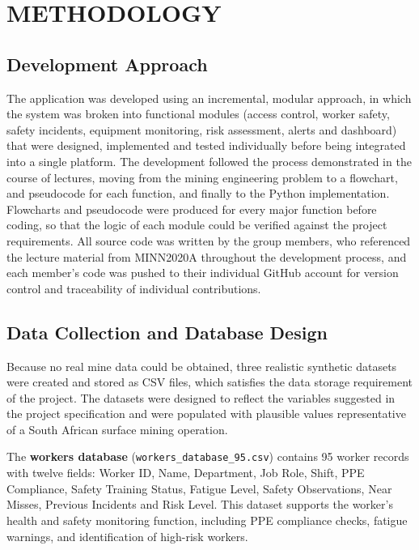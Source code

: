 \documentclass[
]{article}
\begin{document}
\section{ METHODOLOGY}

\subsection{Development Approach}

The application was developed using an incremental, modular approach, in which the system was broken into functional modules (access control, worker safety, safety incidents, equipment monitoring, risk assessment, alerts and dashboard) that were designed, implemented and tested individually before being integrated into a single platform. The development followed the process demonstrated in the course of lectures, moving from the mining engineering problem to a flowchart, and pseudocode for each function, and finally to the Python implementation. Flowcharts and pseudocode were produced for every major function before coding, so that the logic of each module could be verified against the project requirements. All source code was written by the group members, who referenced the lecture material from MINN2020A throughout the development process, and each member's code was pushed to their individual GitHub account for version control and traceability of individual contributions.

\subsection{Data Collection and Database Design}

Because no real mine data could be obtained, three realistic synthetic datasets were created and stored as CSV files, which satisfies the data storage requirement of the project. The datasets were designed to reflect the variables suggested in the project specification and were populated with plausible values representative of a South African surface mining operation.

The \textbf{workers database}
(\texttt{workers\_database\_95.csv}) contains 95 worker records with
twelve fields: Worker ID, Name, Department, Job Role, Shift, PPE
Compliance, Safety Training Status, Fatigue Level, Safety
Observations, Near Misses, Previous Incidents and Risk Level. This
dataset supports the worker's health and safety monitoring function,
including PPE compliance checks, fatigue warnings, and identification
of high-risk workers.
\end{document}
